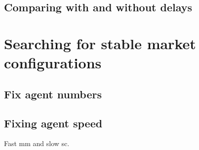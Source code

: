 \subsection{Comparing with and without delays}


\section{Searching for stable market configurations}

\subsection{Fix agent numbers} %
\label{sub:fixing_agent_numbers}


\subsection{Fixing agent speed} %
\label{sub:fixing_agent_speed}
Fast mm and slow sc.
